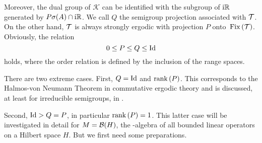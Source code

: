 Moreover, the dual group of $\mathcal{K}$ can be identified with the subgroup of $\mathrm{i}\mathbb{R}$ generated by 
$P\sigma(A) \cap \mathrm{i} \mathbb{R} $.
We call $Q$ the semigroup projection associated with $\mathcal{T}$.
On the other hand, $\mathcal{T}$ is always strongly ergodic with projection $P$ onto $\mathop{}\mathrm{Fix}\left(\mathcal{T}\right)$.
Obviously, the relation
\[
    0 \leq P \leq Q \leq \operatorname{Id} 
\]
holds, where the order relation is defined by the inclusion of the range spaces.

There are two extreme cases.
First, $Q = \operatorname{Id}$ and $ \mathop{}\!\mathrm{rank}\, (P)$.
This corresponds to the Halmos-von Neumann Theorem in commutative ergodic theory and is discussed, at least for irreducible semigroups, in \citet{olesen:1980}.

Second, $\operatorname{Id} > Q = P$, in particular $\mathop{}\!\mathrm{rank}\,(P) = 1$.
This latter case will be investigated in detail for $M = \mathcal{B}(H) $, the \WA-algebra of all bounded linear operators on a Hilbert space $H$.
But we first need some preparations.

